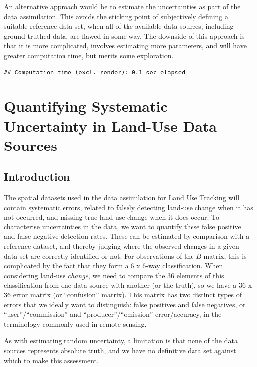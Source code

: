 \documentclass[
]{book}
\begin{document}
An alternative approach would be to estimate the uncertainties as part of the data assimilation. This avoids the sticking point of subjectively defining a suitable reference data-set, when all of the available data sources, including ground-truthed data, are flawed in some way. The downside of this approach is that it is more complicated, involves estimating more parameters, and will have greater computation time, but merits some exploration.

\begin{verbatim}
## Computation time (excl. render): 0.1 sec elapsed
\end{verbatim}

\hypertarget{quantifying-systematic-uncertainty-in-land-use-data-sources}{%
\chapter{Quantifying Systematic Uncertainty in Land-Use Data Sources}\label{quantifying-systematic-uncertainty-in-land-use-data-sources}}

\hypertarget{introduction-2}{%
\section{Introduction}\label{introduction-2}}

The spatial datasets used in the data assimilation for Land Use Tracking will contain systematic errors, related to falsely detecting land-use change when it has not occurred, and missing true land-use change when it does occur.
To characterise uncertainties in the data, we want to quantify these false positive and false negative detection rates.
These can be estimated by comparison with a reference dataset, and thereby judging where the observed changes in a given data set are correctly identified or not.
For observations of the \(B\) matrix, this is complicated by the fact that they form a 6 x 6-way classification. When considering land-use \emph{change}, we need to compare the 36 elements of this classification from one data source with another (or the truth), so we have a 36 x 36 error matrix (or ``confusion'' matrix). This matrix has two distinct types of errors that we ideally want to distinguish: false positives and false negatives, or ``user''/``commission'' and ``producer''/``omission'' error/accuracy, in the terminology commonly used in remote sensing.

As with estimating random uncertainty, a limitation is that none of the data sources represents absolute truth, and we have no definitive data set against which to make this assessment.
\end{document}
